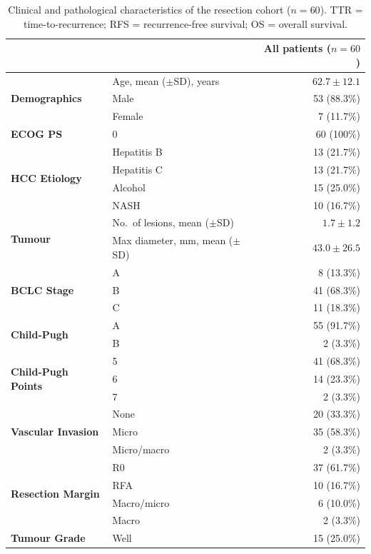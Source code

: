 \documentclass[12pt,twoside]{report}
\begin{document}
\clearpage
\begin{table}[H]
\centering
\small
\caption{Clinical and pathological characteristics of the resection cohort ($n=60$).
TTR = time-to-recurrence; RFS = recurrence-free survival; OS = overall survival.}
\label{tab:clinical}
\begin{tabular}{p{3.8cm}lr}
\hline
 & & All patients ($n=60$) \\
\hline
\multirow{3}{*}{\textbf{Demographics}}
  & Age, mean ($\pm$SD), years & $62.7 \pm 12.1$ \\
  & Male & 53 (88.3\%) \\
  & Female & 7 (11.7\%) \\
\hline
\textbf{ECOG PS} & 0 & 60 (100\%) \\
\hline
\multirow{4}{*}{\textbf{HCC Etiology}}
  & Hepatitis B & 13 (21.7\%) \\
  & Hepatitis C & 13 (21.7\%) \\
  & Alcohol & 15 (25.0\%) \\
  & NASH & 10 (16.7\%) \\
\hline
\multirow{2}{*}{\textbf{Tumour}}
  & No.\ of lesions, mean ($\pm$SD) & $1.7 \pm 1.2$ \\
  & Max diameter, mm, mean ($\pm$SD) & $43.0 \pm 26.5$ \\
\hline
\multirow{3}{*}{\textbf{BCLC Stage}}
  & A & 8 (13.3\%) \\
  & B & 41 (68.3\%) \\
  & C & 11 (18.3\%) \\
\hline
\multirow{2}{*}{\textbf{Child-Pugh}}
  & A & 55 (91.7\%) \\
  & B & 2 (3.3\%) \\
\hline
\multirow{3}{*}{\textbf{Child-Pugh Points}}
  & 5 & 41 (68.3\%) \\
  & 6 & 14 (23.3\%) \\
  & 7 & 2 (3.3\%) \\
\hline
\multirow{3}{*}{\textbf{Vascular Invasion}}
  & None & 20 (33.3\%) \\
  & Micro & 35 (58.3\%) \\
  & Micro/macro & 2 (3.3\%) \\
\hline
\multirow{4}{*}{\textbf{Resection Margin}}
  & R0 & 37 (61.7\%) \\
  & RFA & 10 (16.7\%) \\
  & Macro/micro & 6 (10.0\%) \\
  & Macro & 2 (3.3\%) \\
\hline
\multirow{3}{*}{\textbf{Tumour Grade}}
  & Well & 15 (25.0\%) \\

\end{tabular}
\end{table}
\end{document}
